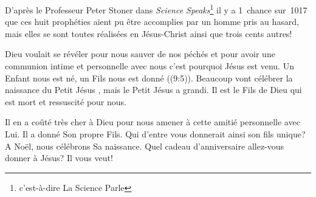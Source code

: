 D'après le Professeur Peter Stoner dans \emph{Science Speaks}\footnote{c'est-à-dire \og La Science Parle \fg{}} il y a 1~chance sur~1017 que ces huit prophéties aient pu être accomplies par un homme pris au hasard, mais elles se sont toutes réalisées en Jésus-Christ ainsi que trois cents autres!

Dieu voulait se révéler pour nous sauver de nos péchés et pour avoir une communion intime et personnelle avec nous \ocadr c'est pourquoi Jésus est venu. \og Un Enfant nous est né, un Fils nous est donné \fg{} ((9:5)). Beaucoup vont célébrer la naissance du \og Petit Jésus \fg{}, mais le \og Petit Jésus \fg{} a grandi. Il est le Fils de Dieu qui est mort et ressuscité pour nous.

Il en a coûté très cher à Dieu pour nous amener à cette amitié personnelle avec Lui. Il a donné Son propre Fils. Qui d'entre vous donnerait ainsi son fils unique? A Noël, nous célébrons Sa naissance. Quel cadeau d'anniversaire allez-vous donner à Jésus? Il vous veut!


